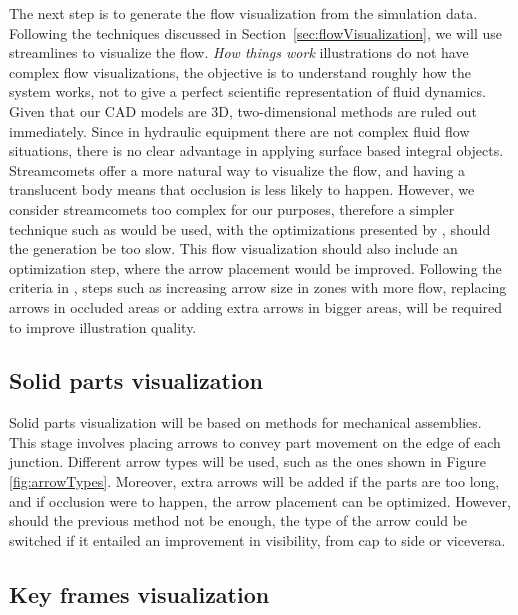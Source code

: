 The next step is to generate the flow visualization from the simulation data.
Following the techniques discussed in Section~\ref{sec:flowVisualization}, we will use streamlines to visualize the flow.
\textit{How things work} illustrations do not have complex flow visualizations, the objective is to understand roughly how the system works, not to give a perfect scientific representation of fluid dynamics.
Given that our CAD models are 3D, two-dimensional methods are ruled out immediately.
Since in hydraulic equipment there are not complex fluid flow situations, there is no clear advantage in applying surface based integral objects.
Streamcomets offer a more natural way to visualize the flow, and having a translucent body means that occlusion is less likely to happen.
However, we consider streamcomets too complex for our purposes, therefore a simpler technique such as \cite{Wicke2009} would be used, with the optimizations presented by \cite{McLoughlin2013}, should the generation be too slow.
This flow visualization should also include an optimization step, where the arrow placement would be improved.
Following the criteria in \cite{Mitra2010}, steps such as increasing arrow size in zones with more flow, replacing arrows in occluded areas or adding extra arrows in bigger areas, will be required to improve illustration quality.

\subsection{Solid parts visualization}

Solid parts visualization will be based on \cite{Mitra2010} methods for mechanical assemblies.
This stage involves placing arrows to convey part movement on the edge of each junction.
Different arrow types will be used, such as the ones shown in Figure \ref{fig:arrowTypes}.
Moreover, extra arrows will be added if the parts are too long, and if occlusion were to happen, the arrow placement can be optimized.
However, should the previous method not be enough, the type of the arrow could be switched if it entailed an improvement in visibility, from cap to side or viceversa.

\subsection{Key frames visualization}

